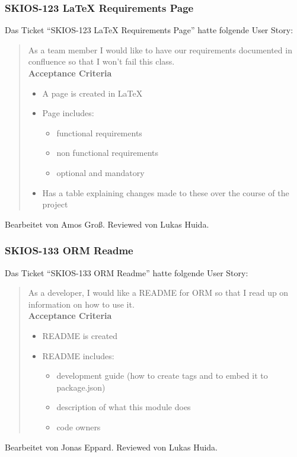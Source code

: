 \subsubsection{SKIOS-123 LaTeX Requirements Page}
Das Ticket \enquote{SKIOS-123 LaTeX Requirements Page} hatte folgende User Story:
\begin{quotation}
    As a team member I would like to have our requirements documented in confluence so that I won't fail this class. \\
\textbf{Acceptance Criteria}
\begin{itemize}
    \item A page is created in LaTeX
    \item Page includes:
    \begin{itemize}
        \item functional requirements
        \item non functional requirements 
        \item optional and mandatory
    \end{itemize}
    \item Has a table explaining changes made to these over the course of the project
\end{itemize}
\end{quotation}
Bearbeitet von Amos Groß.
Reviewed von Lukas Huida.

\subsubsection{SKIOS-133 ORM Readme}
Das Ticket \enquote{SKIOS-133 ORM Readme} hatte folgende User Story:
\begin{quotation}
    As a developer, I would like a README for ORM so that I read up on information on how to use it. \\
\textbf{Acceptance Criteria}
\begin{itemize}
    \item README is created
    \item README includes:
    \begin{itemize}
        \item development guide (how to create tags and to embed it to package.json)
        \item description of what this module does
        \item code owners 
    \end{itemize}
\end{itemize}
\end{quotation}
Bearbeitet von Jonas Eppard.
Reviewed von Lukas Huida.

